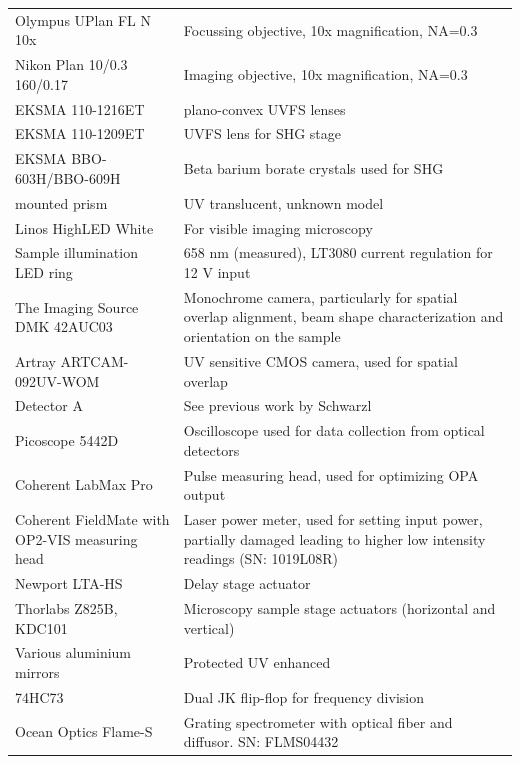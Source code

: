 \documentclass[twoside,openright,listof=numbered]{scrreprt}
\begin{document}
\begin{longtable}{p{}p{}}
    Olympus UPlan FL N 10x & Focussing objective, 10x magnification, NA=0.3 \\
    Nikon Plan 10/0.3 160/0.17 & Imaging objective, 10x magnification, NA=0.3 \\
    EKSMA 110-1216ET& plano-convex UVFS lenses\\
    EKSMA 110-1209ET& UVFS lens for SHG stage\\
    EKSMA BBO-603H/BBO-609H & Beta barium borate crystals used for SHG\\
    mounted prism & UV translucent, unknown model\\
    Linos HighLED White & For visible imaging microscopy \\
    Sample illumination LED ring & 658 nm (measured), LT3080 current regulation for 12 V input \\
    The Imaging Source DMK 42AUC03 & Monochrome camera, particularly for spatial overlap alignment, beam shape characterization and orientation on the sample \\
    Artray ARTCAM-092UV-WOM & UV sensitive CMOS camera, used for spatial overlap\\
    Detector A & See previous work by Schwarzl \cite{Schwarzl2022} \\
    Picoscope 5442D & Oscilloscope used for data collection from optical detectors \\
    Coherent LabMax Pro & Pulse measuring head, used for optimizing OPA output \\
    Coherent FieldMate with OP2-VIS measuring head & Laser power meter, used for setting input power, partially damaged leading to higher low intensity readings (SN: 1019L08R) \\
    Newport LTA-HS & Delay stage actuator \\
    Thorlabs Z825B, KDC101 & Microscopy sample stage actuators (horizontal and vertical) \\
    Various aluminium mirrors & Protected UV enhanced \\
    74HC73 & Dual JK flip-flop for frequency division\\
    Ocean Optics Flame-S & Grating spectrometer with optical fiber and diffusor. SN: FLMS04432 
\end{longtable}
\end{document}
